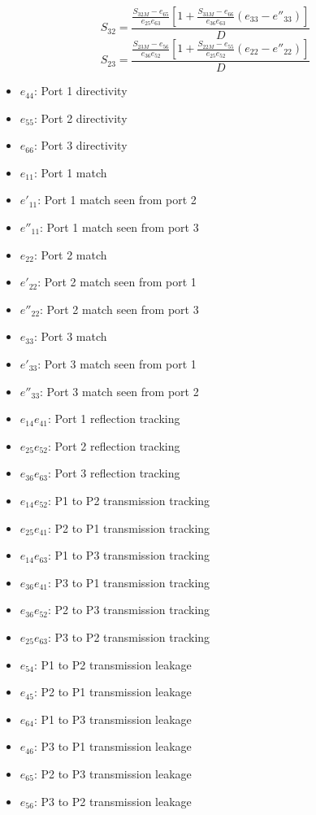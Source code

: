 \begin{equation}
S_{32} = \frac{\frac{S_{32M}-e_{65}}{e_{25}e_{63}}\left[1+\frac{S_{33M}-e_{66}}{e_{36}e_{63}}(e_{33}-e''_{33})\right]}{D}
\end{equation}
\begin{equation}
S_{23} = \frac{\frac{S_{23M}-e_{56}}{e_{36}e_{52}}\left[1+\frac{S_{22M}-e_{55}}{e_{25}e_{52}}(e_{22}-e''_{22})\right]}{D}
\end{equation}



\newpage
\begin{itemize}
	\item $e_{44}$: Port 1 directivity
	\item $e_{55}$: Port 2 directivity
	\item $e_{66}$: Port 3 directivity
	\item $e_{11}$: Port 1 match
	\item $e'_{11}$: Port 1 match seen from port 2
	\item $e''_{11}$: Port 1 match seen from port 3
	\item $e_{22}$: Port 2 match
	\item $e'_{22}$: Port 2 match seen from port 1
	\item $e''_{22}$: Port 2 match seen from port 3
	\item $e_{33}$: Port 3 match
	\item $e'_{33}$: Port 3 match seen from port 1
	\item $e''_{33}$: Port 3 match seen from port 2
	\item $e_{14}e_{41}$: Port 1 reflection tracking
	\item $e_{25}e_{52}$: Port 2 reflection tracking
	\item $e_{36}e_{63}$: Port 3 reflection tracking
	\item $e_{14}e_{52}$: P1 to P2 transmission tracking
	\item $e_{25}e_{41}$: P2 to P1 transmission tracking
	\item $e_{14}e_{63}$: P1 to P3 transmission tracking
	\item $e_{36}e_{41}$: P3 to P1 transmission tracking
	\item $e_{36}e_{52}$: P2 to P3 transmission tracking
	\item $e_{25}e_{63}$: P3 to P2 transmission tracking
	\item $e_{54}$: P1 to P2 transmission leakage
	\item $e_{45}$: P2 to P1 transmission leakage
	\item $e_{64}$: P1 to P3 transmission leakage
	\item $e_{46}$: P3 to P1 transmission leakage
	\item $e_{65}$: P2 to P3 transmission leakage
	\item $e_{56}$: P3 to P2 transmission leakage
\end{itemize}

